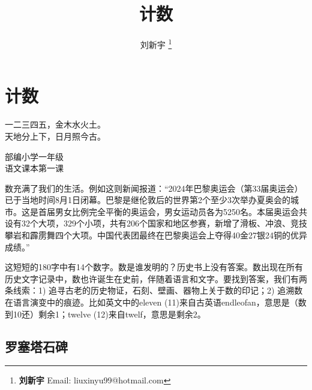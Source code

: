 \documentclass[b5paper]{ctexart}
\begin{document}
\title{计数}

\author{刘新宇
\thanks{{\bfseries 刘新宇} \newline
  Email: liuxinyu99@hotmail.com \newline}
  }

\maketitle
\fi


\ifx\wholebook\relax
\chapter{计数}
\fi

\epigraph{一二三四五，金木水火土。\\
天地分上下，日月照今古。}{部编小学一年级\\
语文课本第一课}

数充满了我们的生活。例如这则新闻报道：“2024年巴黎奥运会（第33届奥运会）已于当地时间8月1日闭幕。巴黎是继伦敦后的世界第2个至少3次举办夏奥会的城市。这是首届男女比例完全平衡的奥运会，男女运动员各为5250名。本届奥运会共设有32个大项，329个小项，共有206个国家和地区参赛，新增了滑板、冲浪、竞技攀岩和霹雳舞四个大项。中国代表团最终在巴黎奥运会上夺得40金27银24铜的优异成绩。”

这短短的180字中有14个数字。数是谁发明的？历史书上没有答案。数出现在所有历史文字记录中，数也许诞生在史前，伴随着语言和文字。要找到答案，我们有两条线索：1) 追寻古老的历史物证，石刻、壁画、器物上关于数的印记；2) 追溯数在语言演变中的痕迹。比如英文中的eleven (11)来自古英语endleofan，意思是（数到10还）剩余1；twelve (12)来自twelf，意思是剩余2。

\section{罗塞塔石碑}
 \label{sec:rosetta-stone}
\end{document}

